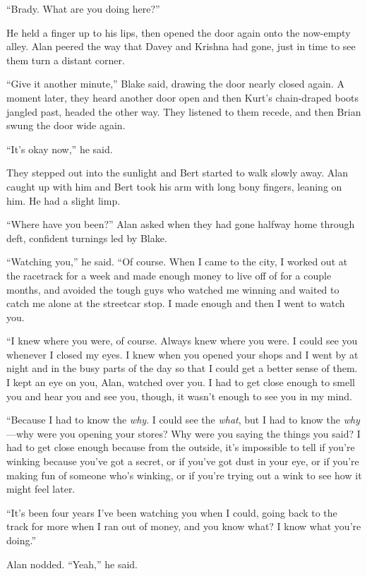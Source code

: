 ``Brady.  What are you doing here?''

He held a finger up to his lips, then opened the door again onto the
now-empty alley.  Alan peered the way that Davey and Krishna had gone,
just in time to see them turn a distant corner.

``Give it another minute,'' Blake said, drawing the door nearly closed
again.  A moment later, they heard another door open and then Kurt's
chain-draped boots jangled past, headed the other way.  They listened
to them recede, and then Brian swung the door wide again.

``It's okay now,'' he said.

They stepped out into the sunlight and Bert started to walk slowly
away.  Alan caught up with him and Bert took his arm with long bony
fingers, leaning on him.  He had a slight limp.

``Where have you been?'' Alan asked when they had gone halfway home
through deft, confident turnings led by Blake.

``Watching you,'' he said.  ``Of course.  When I came to the city, I
worked out at the racetrack for a week and made enough money to live
off of for a couple months, and avoided the tough guys who watched me
winning and waited to catch me alone at the streetcar stop.  I made
enough and then I went to watch you.

``I knew where you were, of course.  Always knew where you were.  I
could see you whenever I closed my eyes.  I knew when you opened your
shops and I went by at night and in the busy parts of the day so that
I could get a better sense of them.  I kept an eye on you, Alan,
watched over you.  I had to get close enough to smell you and hear you
and see you, though, it wasn't enough to see you in my mind.

``Because I had to know the \textit{why}.  I could see the
\textit{what}, but I had to know the \textit{why}---why were you
opening your stores?  Why were you saying the things you said?  I had
to get close enough because from the outside, it's impossible to tell
if you're winking because you've got a secret, or if you've got dust
in your eye, or if you're making fun of someone who's winking, or if
you're trying out a wink to see how it might feel later.

``It's been four years I've been watching you when I could, going back
to the track for more when I ran out of money, and you know what?  I
know what you're doing.''

Alan nodded.  ``Yeah,'' he said.

